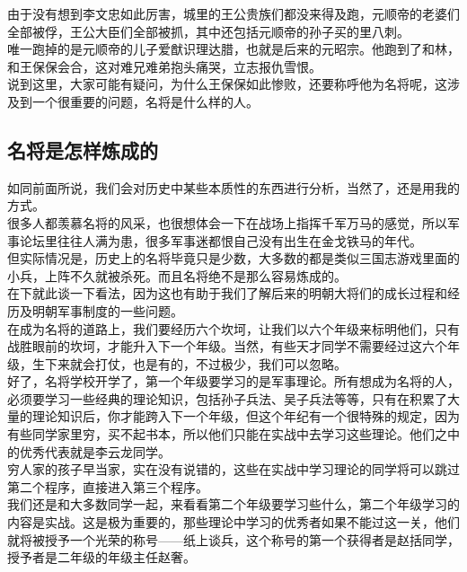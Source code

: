 \begin{multicols}{\theparacolNo}
由于没有想到李文忠如此厉害，城里的王公贵族们都没来得及跑，元顺帝的老婆们全部被俘，王公大臣们全部被抓，其中还包括元顺帝的孙子买的里八刺。\\

唯一跑掉的是元顺帝的儿子爱猷识理达腊，也就是后来的元昭宗。他跑到了和林，和王保保会合，这对难兄难弟抱头痛哭，立志报仇雪恨。\\

说到这里，大家可能有疑问，为什么王保保如此惨败，还要称呼他为名将呢，这涉及到一个很重要的问题，名将是什么样的人。\\

\subsection{名将是怎样炼成的}
如同前面所说，我们会对历史中某些本质性的东西进行分析，当然了，还是用我的方式。\\

很多人都羡慕名将的风采，也很想体会一下在战场上指挥千军万马的感觉，所以军事论坛里往往人满为患，很多军事迷都恨自己没有出生在金戈铁马的年代。\\

但实际情况是，历史上的名将毕竟只是少数，大多数的都是类似三国志游戏里面的小兵，上阵不久就被杀死。而且名将绝不是那么容易炼成的。\\

在下就此谈一下看法，因为这也有助于我们了解后来的明朝大将们的成长过程和经历及明朝军事制度的一些问题。\\

在成为名将的道路上，我们要经历六个坎坷，让我们以六个年级来标明他们，只有战胜眼前的坎坷，才能升入下一个年级。当然，有些天才同学不需要经过这六个年级，生下来就会打仗，也是有的，不过极少，我们可以忽略。\\

好了，名将学校开学了，第一个年级要学习的是军事理论。所有想成为名将的人，必须要学习一些经典的理论知识，包括孙子兵法、吴子兵法等等，只有在积累了大量的理论知识后，你才能跨入下一个年级，但这个年纪有一个很特殊的规定，因为有些同学家里穷，买不起书本，所以他们只能在实战中去学习这些理论。他们之中的优秀代表就是李云龙同学。\\

穷人家的孩子早当家，实在没有说错的，这些在实战中学习理论的同学将可以跳过第二个程序，直接进入第三个程序。\\

我们还是和大多数同学一起，来看看第二个年级要学习些什么，第二个年级学习的内容是实战。这是极为重要的，那些理论中学习的优秀者如果不能过这一关，他们就将被授予一个光荣的称号——纸上谈兵，这个称号的第一个获得者是赵括同学，授予者是二年级的年级主任赵奢。\\


\end{multicols}
